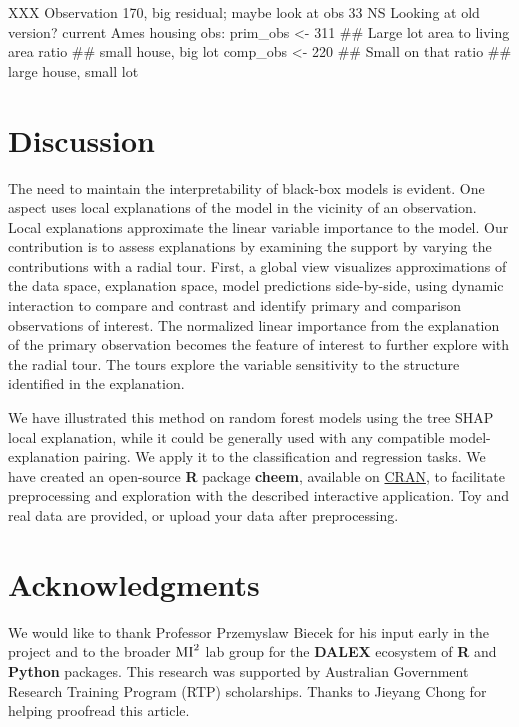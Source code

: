 \documentclass[
]{article}
\begin{document}
XXX Observation 170, big residual; maybe look at obs 33
NS Looking at old version? current Ames housing obs:
prim\_obs \textless- 311 \#\# Large lot area to living area ratio \#\# small house, big lot
comp\_obs \textless- 220 \#\# Small on that ratio \#\# large house, small lot

\hypertarget{sec:cheemdiscussion}{%
\section{Discussion}\label{sec:cheemdiscussion}}

The need to maintain the interpretability of black-box models is evident. One aspect uses local explanations of the model in the vicinity of an observation. Local explanations approximate the linear variable importance to the model. Our contribution is to assess explanations by examining the support by varying the contributions with a radial tour. First, a global view visualizes approximations of the data space, explanation space, model predictions side-by-side, using dynamic interaction to compare and contrast and identify primary and comparison observations of interest. The normalized linear importance from the explanation of the primary observation becomes the feature of interest to further explore with the radial tour. The tours explore the variable sensitivity to the structure identified in the explanation.

We have illustrated this method on random forest models using the tree SHAP local explanation, while it could be generally used with any compatible model-explanation pairing. We apply it to the classification and regression tasks. We have created an open-source \textbf{R} package \textbf{cheem}, available on \href{https://CRAN.R-project.org/package=cheem}{CRAN}, to facilitate preprocessing and exploration with the described interactive application. Toy and real data are provided, or upload your data after preprocessing.

\hypertarget{acknowledgments}{%
\section{Acknowledgments}\label{acknowledgments}}

We would like to thank Professor Przemyslaw Biecek for his input early in the project and to the broader \(\text{MI}^\text2\) lab group for the \textbf{DALEX} ecosystem of \textbf{R} and \textbf{Python} packages. This research was supported by Australian Government Research Training Program (RTP) scholarships. Thanks to Jieyang Chong for helping proofread this article.
\end{document}
